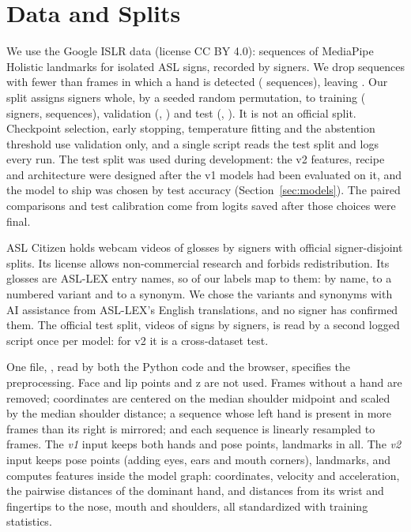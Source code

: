 \section{Data and Splits}
\label{sec:data}

We use the Google ISLR data \cite{kaggle2023islr} (license CC BY 4.0):  sequences
of MediaPipe Holistic landmarks for  isolated ASL signs, recorded by
 signers. We drop sequences with fewer than  frames in which a
hand is detected ( sequences), leaving . Our split assigns signers
whole, by a seeded random permutation, to training ( signers,
 sequences), validation (, ) and test
(, ). It is not an official split. Checkpoint selection, early
stopping, temperature fitting and the abstention threshold use validation only, and a single
script reads the test split and logs every run. The test split was used during development: the
v2 features, recipe and architecture were designed after the v1 models had been evaluated on it,
and the model to ship was chosen by test accuracy (Section~\ref{sec:models}). The paired
comparisons and test calibration come from logits saved after those choices were final.

ASL Citizen \cite{desai2023aslcitizen} holds  webcam videos of
 glosses by  signers with official signer-disjoint splits.
Its license allows non-commercial research and forbids redistribution. Its glosses are ASL-LEX
entry names, so  of our  labels map to them:
 by name,  to a numbered variant and  to a
synonym. We chose the variants and synonyms with AI assistance from ASL-LEX's English
translations, and no signer has confirmed them. The official test split,  videos of
 signs by  signers, is read by a second logged script once per model:
for v2 it is a cross-dataset test.

One file, , read by both the Python code and the browser, specifies the
preprocessing. Face and lip points and z are not used. Frames without a hand are removed;
coordinates are centered on the median shoulder midpoint and scaled by the median shoulder
distance; a sequence whose left hand is present in more frames than its right is mirrored; and
each sequence is linearly resampled to  frames. The \emph{v1} input keeps both
hands and  pose points,  landmarks in all. The \emph{v2} input
keeps  pose points (adding eyes, ears and mouth corners), 
landmarks, and computes 
features inside the model graph: coordinates, velocity and acceleration, the 
pairwise distances of the dominant hand, and  distances from its wrist and
fingertips to the nose, mouth and shoulders, all standardized with training statistics.
